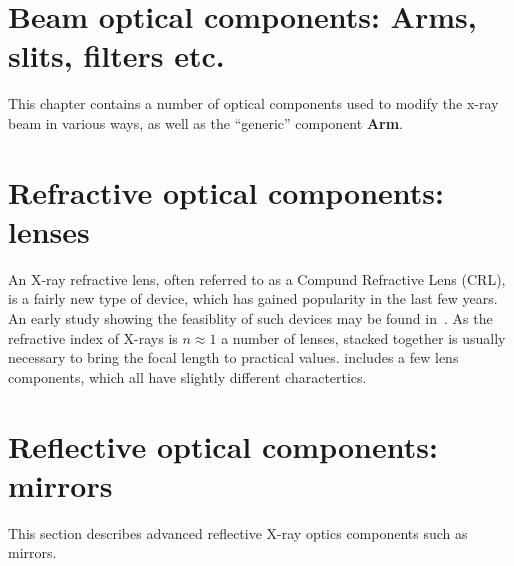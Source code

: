 
\chapter{Beam optical components:
Arms, slits, filters etc.}
This chapter contains a number of optical components
used to modify the x-ray beam in various ways,
as well as the ``generic'' component \textbf{Arm}.















\newpage
\chapter{Refractive optical components: lenses}
\label{c:lenses}

An X-ray refractive lens, often referred to as a Compund Refractive Lens (CRL), is a fairly new type of device, which has gained popularity in
the last few years. An early study showing the feasiblity of such devices may be found in~\cite{snigirev1996}. As the refractive index of X-rays
is $n\approx1$ a number of lenses, stacked together is usually necessary to bring the focal length to practical values. 
\MCX includes a few lens components, which all have slightly different charactertics.







\newpage
\chapter{Reflective optical components: mirrors}
\label{c:mirrors}
This section describes advanced reflective X-ray optics
components such as mirrors.
%






